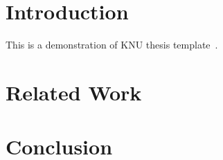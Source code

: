 \documentclass[b5paper,11pt,oneside,openany,article,no-math]{memoir}
\begin{document}
\frontmatter

\maketitle
\makeapproval

\setcounter{page}{1}

\clearpage
\tableofcontents*
\clearpage
\listoffigures*
\clearpage
\listoftables*

\hypersetup{linkcolor=red}

\mainmatter


\clearpage
\chapter{Introduction}

This is a demonstration of KNU thesis template~\cite{knuthesis2015}.

\clearpage
\chapter{Related Work}

\clearpage
\chapter{Conclusion}
% 
% 
% 
% 
% 
% 

\clearpage
\appendix

\backmatter



\clearpage
{} %
\end{document}
